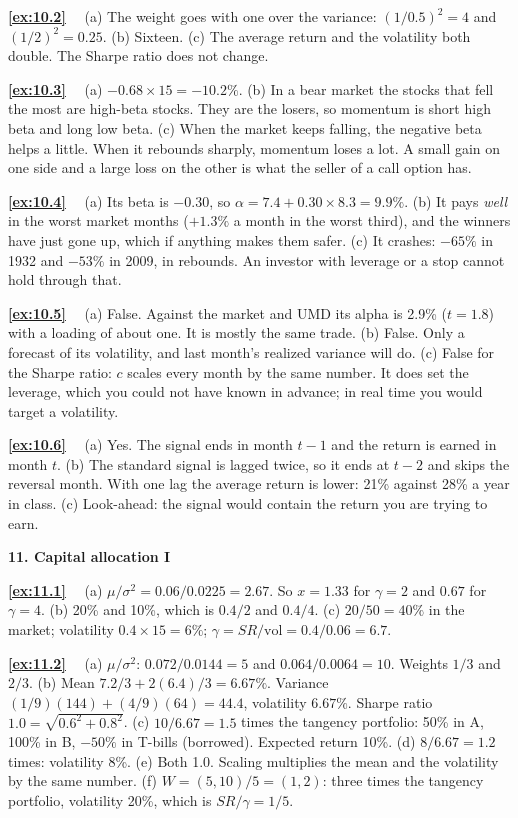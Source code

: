 \documentclass[11pt]{article}
\newcounter{ex}[section]
\newcommand{\sol}[1]{\par\smallskip\textbf{\ref{#1}}\ \ }
\newcommand{\head}[1]{\par\medskip\textbf{#1}\par}
\newcommand{\SR}{\mathit{SR}}
\begin{document}
{\sol{ex:10.2} (a) The weight goes with one over the variance: $(1/0.5)^{2} = 4$ and $(1/2)^{2} = 0.25$. (b) Sixteen. (c) The
average return and the volatility both double. The Sharpe ratio does not change.

\sol{ex:10.3} (a) $-0.68\times 15 = -10.2\%$. (b) In a bear market the stocks that fell the most are high-beta stocks.
They are the losers, so momentum is short high beta and long low beta. (c) When the market keeps falling, the negative
beta helps a little. When it rebounds sharply, momentum loses a lot. A small gain on one side and a large loss on the
other is what the seller of a call option has.

\sol{ex:10.4} (a) Its beta is $-0.30$, so $\alpha = 7.4 + 0.30\times 8.3 = 9.9\%$. (b) It pays \emph{well} in the worst
market months ($+1.3\%$ a month in the worst third), and the winners have just gone up, which if anything makes them
safer. (c) It crashes: $-65\%$ in 1932 and $-53\%$ in 2009, in rebounds. An investor with leverage or a stop cannot hold
through that.

\sol{ex:10.5} (a) False. Against the market and UMD its alpha is 2.9\% ($t = 1.8$) with a loading of about one. It is
mostly the same trade. (b) False. Only a forecast of its volatility, and last month's realized variance will do.
(c) False for the Sharpe ratio: $c$ scales every month by the same number. It does set the leverage, which you could not
have known in advance; in real time you would target a volatility.

\sol{ex:10.6} (a) Yes. The signal ends in month $t-1$ and the return is earned in month $t$. (b) The standard signal is
lagged twice, so it ends at $t-2$ and skips the reversal month. With one lag the average return is lower: 21\% against
28\% a year in class. (c) Look-ahead: the signal would contain the return you are trying to earn.

\head{11. Capital allocation I}

\sol{ex:11.1} (a) $\mu/\sigma^{2} = 0.06/0.0225 = 2.67$. So $x = 1.33$ for $\gamma = 2$ and $0.67$ for $\gamma = 4$. (b) 20\% and
10\%, which is $0.4/2$ and $0.4/4$. (c) $20/50 = 40\%$ in the market; volatility $0.4\times 15 = 6\%$; $\gamma = \SR/\text{vol} =
0.4/0.06 = 6.7$.

\sol{ex:11.2} (a) $\mu/\sigma^{2}$: $0.072/0.0144 = 5$ and $0.064/0.0064 = 10$. Weights $1/3$ and $2/3$. (b) Mean
$7.2/3 + 2(6.4)/3 = 6.67\%$. Variance $(1/9)(144) + (4/9)(64) = 44.4$, volatility $6.67\%$. Sharpe ratio $1.0 =
\sqrt{0.6^{2} + 0.8^{2}}$. (c) $10/6.67 = 1.5$ times the tangency portfolio: 50\% in A, 100\% in B, $-50\%$ in T-bills
(borrowed). Expected return 10\%. (d) $8/6.67 = 1.2$ times: volatility 8\%. (e) Both 1.0. Scaling multiplies the mean and
the volatility by the same number. (f) $W = (5, 10)/5 = (1, 2)$: three times the tangency portfolio, volatility 20\%,
which is $\SR/\gamma = 1/5$.

}
\end{document}
